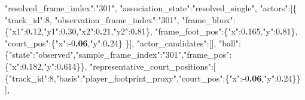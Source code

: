 \documentclass[
  9pt,
  a4paper,
]{article}
\newenvironment{Shaded}{}{}
\newcommand{\DataTypeTok}[1]{\textcolor[rgb]{0.56,0.13,0.00}{#1}}
\newcommand{\DecValTok}[1]{\textcolor[rgb]{0.25,0.63,0.44}{#1}}
\newcommand{\ErrorTok}[1]{\textcolor[rgb]{1.00,0.00,0.00}{\textbf{#1}}}
\newcommand{\FunctionTok}[1]{\textcolor[rgb]{0.02,0.16,0.49}{#1}}
\newcommand{\OtherTok}[1]{\textcolor[rgb]{0.00,0.44,0.13}{#1}}
\newcommand{\StringTok}[1]{\textcolor[rgb]{0.25,0.44,0.63}{#1}}
\begin{document}
\begin{Shaded}
\begin{Highlighting}[]
      \DataTypeTok{"resolved\_\allowbreak{}frame\_\allowbreak{}index"}\FunctionTok{:}\StringTok{"301"}\FunctionTok{,}
      \DataTypeTok{"association\_\allowbreak{}state"}\FunctionTok{:}\StringTok{"resolved\_\allowbreak{}single"}\FunctionTok{,}
      \DataTypeTok{"actors"}\FunctionTok{:}\OtherTok{[}\FunctionTok{\{}
        \DataTypeTok{"track\_\allowbreak{}id"}\FunctionTok{:}\DecValTok{8}\FunctionTok{,}
        \DataTypeTok{"observation\_\allowbreak{}frame\_\allowbreak{}index"}\FunctionTok{:}\StringTok{"301"}\FunctionTok{,}
        \DataTypeTok{"frame\_\allowbreak{}bbox"}\FunctionTok{:\{}\DataTypeTok{"x1"}\FunctionTok{:}\DecValTok{0}\ErrorTok{.}\DecValTok{12}\FunctionTok{,}\DataTypeTok{"y1"}\FunctionTok{:}\DecValTok{0}\ErrorTok{.}\DecValTok{30}\FunctionTok{,}\DataTypeTok{"x2"}\FunctionTok{:}\DecValTok{0}\ErrorTok{.}\DecValTok{21}\FunctionTok{,}\DataTypeTok{"y2"}\FunctionTok{:}\DecValTok{0}\ErrorTok{.}\DecValTok{81}\FunctionTok{\},}
        \DataTypeTok{"frame\_\allowbreak{}foot\_\allowbreak{}pos"}\FunctionTok{:\{}\DataTypeTok{"x"}\FunctionTok{:}\DecValTok{0}\ErrorTok{.}\DecValTok{165}\FunctionTok{,}\DataTypeTok{"y"}\FunctionTok{:}\DecValTok{0}\ErrorTok{.}\DecValTok{81}\FunctionTok{\},}
        \DataTypeTok{"court\_\allowbreak{}pos"}\FunctionTok{:\{}\DataTypeTok{"x"}\FunctionTok{:}\DecValTok{{-}0}\ErrorTok{.06}\FunctionTok{,}\DataTypeTok{"y"}\FunctionTok{:}\DecValTok{0}\ErrorTok{.}\DecValTok{24}\FunctionTok{\}}
      \FunctionTok{\}}\OtherTok{]}\FunctionTok{,}
      \DataTypeTok{"actor\_\allowbreak{}candidates"}\FunctionTok{:}\OtherTok{[]}\FunctionTok{,}
      \DataTypeTok{"ball"}\FunctionTok{:\{}\DataTypeTok{"state"}\FunctionTok{:}\StringTok{"observed"}\FunctionTok{,}\DataTypeTok{"sample\_\allowbreak{}frame\_\allowbreak{}index"}\FunctionTok{:}\StringTok{"301"}\FunctionTok{,}\DataTypeTok{"frame\_\allowbreak{}pos"}\FunctionTok{:\{}\DataTypeTok{"x"}\FunctionTok{:}\DecValTok{0}\ErrorTok{.}\DecValTok{182}\FunctionTok{,}\DataTypeTok{"y"}\FunctionTok{:}\DecValTok{0}\ErrorTok{.}\DecValTok{614}\FunctionTok{\}\},}
      \DataTypeTok{"representative\_\allowbreak{}court\_\allowbreak{}positions"}\FunctionTok{:}\OtherTok{[}
        \FunctionTok{\{}\DataTypeTok{"track\_\allowbreak{}id"}\FunctionTok{:}\DecValTok{8}\FunctionTok{,}\DataTypeTok{"basis"}\FunctionTok{:}\StringTok{"player\_\allowbreak{}footprint\_\allowbreak{}proxy"}\FunctionTok{,}\DataTypeTok{"court\_\allowbreak{}pos"}\FunctionTok{:\{}\DataTypeTok{"x"}\FunctionTok{:}\DecValTok{{-}0}\ErrorTok{.06}\FunctionTok{,}\DataTypeTok{"y"}\FunctionTok{:}\DecValTok{0}\ErrorTok{.}\DecValTok{24}\FunctionTok{\}\}}
      \OtherTok{]}\FunctionTok{,}

\end{Highlighting}
\end{Shaded}
\end{document}
